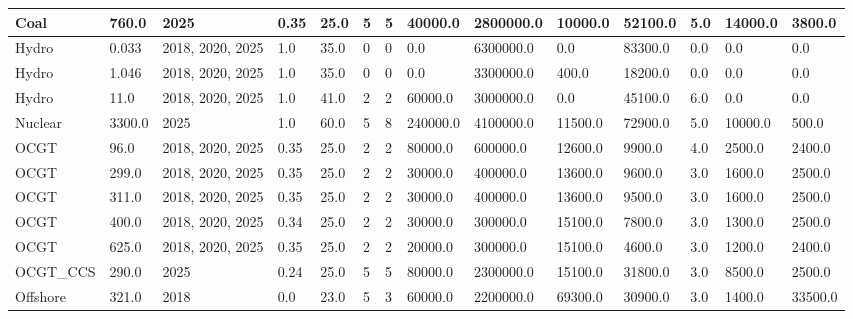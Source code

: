 \documentclass[sigconf]{acmart}
\begin{document}
\begin{table*}[]
\begin{tabularx}{\linewidth}{|p{}|l|l|l|l|l|l|l|l|l|l|l|l|l|}
Coal                          & 760.0       & 2025             & 0.35   & 25.0 & 5     & 5     & 40000.0  & 2800000.0 & 10000.0  & 52100.0 & 5.0   & 14000.0 & 3800.0   \\ \hline
Hydro                         & 0.033       & 2018, 2020, 2025 & 1.0    & 35.0 & 0     & 0     & 0.0      & 6300000.0 & 0.0      & 83300.0 & 0.0   & 0.0     & 0.0      \\ \hline
Hydro                         & 1.046       & 2018, 2020, 2025 & 1.0    & 35.0 & 0     & 0     & 0.0      & 3300000.0 & 400.0    & 18200.0 & 0.0   & 0.0     & 0.0      \\ \hline
Hydro                         & 11.0        & 2018, 2020, 2025 & 1.0    & 41.0 & 2     & 2     & 60000.0  & 3000000.0 & 0.0      & 45100.0 & 6.0   & 0.0     & 0.0      \\ \hline
Nuclear                       & 3300.0      & 2025             & 1.0    & 60.0 & 5     & 8     & 240000.0 & 4100000.0 & 11500.0  & 72900.0 & 5.0   & 10000.0 & 500.0    \\ \hline
OCGT                          & 96.0        & 2018, 2020, 2025 & 0.35   & 25.0 & 2     & 2     & 80000.0  & 600000.0  & 12600.0  & 9900.0  & 4.0   & 2500.0  & 2400.0   \\ \hline
OCGT                          & 299.0       & 2018, 2020, 2025 & 0.35   & 25.0 & 2     & 2     & 30000.0  & 400000.0  & 13600.0  & 9600.0  & 3.0   & 1600.0  & 2500.0   \\ \hline
OCGT                          & 311.0       & 2018, 2020, 2025 & 0.35   & 25.0 & 2     & 2     & 30000.0  & 400000.0  & 13600.0  & 9500.0  & 3.0   & 1600.0  & 2500.0   \\ \hline
OCGT                          & 400.0       & 2018, 2020, 2025 & 0.34   & 25.0 & 2     & 2     & 30000.0  & 300000.0  & 15100.0  & 7800.0  & 3.0   & 1300.0  & 2500.0   \\ \hline
OCGT                          & 625.0       & 2018, 2020, 2025 & 0.35   & 25.0 & 2     & 2     & 20000.0  & 300000.0  & 15100.0  & 4600.0  & 3.0   & 1200.0  & 2400.0   \\ \hline
OCGT\_CCS                     & 290.0       & 2025             & 0.24   & 25.0 & 5     & 5     & 80000.0  & 2300000.0 & 15100.0  & 31800.0 & 3.0   & 8500.0  & 2500.0   \\ \hline
Offshore                      & 321.0       & 2018             & 0.0    & 23.0 & 5     & 3     & 60000.0  & 2200000.0 & 69300.0  & 30900.0 & 3.0   & 1400.0  & 33500.0  \\ \hline

\end{tabularx}
\end{table*}
\end{document}
